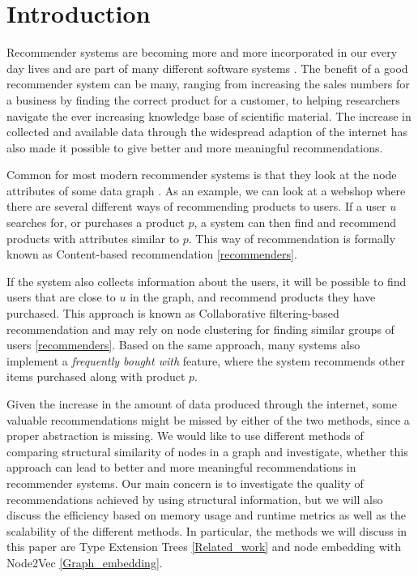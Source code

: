 \section{Introduction}
  Recommender systems are becoming more and more incorporated in our every day lives and are part of many different software systems \cite{recommender_e-comerce}. The benefit of a good recommender system can be many,  ranging from increasing the sales numbers for a business by finding the correct product for a customer, to helping researchers navigate the ever increasing knowledge base of scientific material. The increase in collected and available data through the widespread adaption of the internet has also made it possible to give better and more meaningful recommendations.

  Common for most modern recommender systems is that they look at the node attributes of some data graph \cite{Ricci2015}. As an example, we can look at a webshop where there are several different ways of recommending products to users. If a user $u$ searches for, or purchases a product $p$, a system can then find and recommend products with attributes similar to $p$. This way of recommendation is formally known as Content-based recommendation \ref{recommenders}.

  If the system also collects information about the users, it will be possible to find users that are close to $u$ in the graph, and recommend products they have purchased. This approach is known as Collaborative filtering-based recommendation and may rely on node clustering for finding similar groups of users \ref{recommenders}. Based on the same approach, many systems also implement a \textit{frequently bought with} feature, where the system recommends other items purchased along with product $p$.

  Given the increase in the amount of data produced through the internet, some valuable recommendations might be missed by either of the two methods, since a proper abstraction is missing. We would like to use different methods of comparing structural similarity of nodes in a graph and investigate, whether this approach can lead to better and more meaningful recommendations in recommender systems. Our main concern is to investigate the quality of recommendations achieved by using structural information, but we will also discuss the efficiency based on memory usage and runtime metrics as well as the scalability of the different methods. In particular, the methods we will discuss in this paper are Type Extension Trees \ref{Related_work} and node embedding with Node2Vec \ref{Graph_embedding}.


